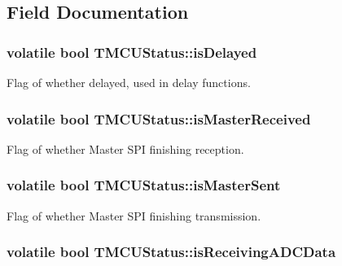 \subsection{Field Documentation}
\hypertarget{struct_t_m_c_u_status_ad8338db303c6d87f044bdc059deee376}{
\subsubsection[{is\-Delayed}]{\setlength{\rightskip}{0pt plus 5cm}volatile bool T\-M\-C\-U\-Status\-::is\-Delayed}}\label{struct_t_m_c_u_status_ad8338db303c6d87f044bdc059deee376}
Flag of whether delayed, used in delay functions. \hypertarget{struct_t_m_c_u_status_a758b50c845375122567c83d5d2ead1ea}{
\subsubsection[{is\-Master\-Received}]{\setlength{\rightskip}{0pt plus 5cm}volatile bool T\-M\-C\-U\-Status\-::is\-Master\-Received}}\label{struct_t_m_c_u_status_a758b50c845375122567c83d5d2ead1ea}
Flag of whether Master S\-P\-I finishing reception. \hypertarget{struct_t_m_c_u_status_a8c8822fd6c3cd3a66b0c57f7f599084e}{
\subsubsection[{is\-Master\-Sent}]{\setlength{\rightskip}{0pt plus 5cm}volatile bool T\-M\-C\-U\-Status\-::is\-Master\-Sent}}\label{struct_t_m_c_u_status_a8c8822fd6c3cd3a66b0c57f7f599084e}
Flag of whether Master S\-P\-I finishing transmission. \hypertarget{struct_t_m_c_u_status_a1874f5f942ba06c9a04cf9d80d886c69}{
\subsubsection[{is\-Receiving\-A\-D\-C\-Data}]{\setlength{\rightskip}{0pt plus 5cm}volatile bool T\-M\-C\-U\-Status\-::is\-Receiving\-A\-D\-C\-Data}}\label{struct_t_m_c_u_status_a1874f5f942ba06c9a04cf9d80d886c69}

